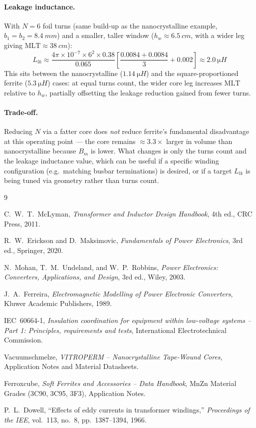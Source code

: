\documentclass[11pt,a4paper]{article}
\begin{document}
\paragraph{Leakage inductance.} With $N=6$ foil turns (same build-up as the
nanocrystalline example, $b_1=b_2=\SI{8.4}{mm}$) and a smaller, taller window
($h_w\approx\SI{6.5}{cm}$, with a wider leg giving $\mathrm{MLT}\approx\SI{38}{cm}$):
\begin{equation}
    L_{lk} \approx \frac{4\pi\times10^{-7}\times6^2\times0.38}{0.065}
    \left[\frac{0.0084+0.0084}{3}+0.002\right] \approx \SI{2.0}{\micro H}
\end{equation}
This sits between the nanocrystalline ($\SI{1.14}{\micro H}$) and the
square-proportioned ferrite ($\SI{5.3}{\micro H}$) cases: at equal turns count,
the wider core leg increases $\mathrm{MLT}$ relative to $h_w$, partially offsetting
the leakage reduction gained from fewer turns.

\paragraph{Trade-off.} Reducing $N$ via a fatter core does \emph{not} reduce
ferrite's fundamental disadvantage at this operating point — the core remains
$\approx 3.3\times$ larger in volume than nanocrystalline because $B_m$ is lower.
What changes is only the turns count and the leakage inductance value, which can
be useful if a specific winding configuration (e.g.\ matching busbar
terminations) is desired, or if a target $L_{lk}$ is being tuned via geometry
rather than turns count.

\begin{thebibliography}{9}

C.~W.~T.~McLyman, \textit{Transformer and Inductor Design Handbook}, 4th ed.,
CRC Press, 2011.

R.~W.~Erickson and D.~Maksimovic, \textit{Fundamentals of Power Electronics},
3rd ed., Springer, 2020.

N.~Mohan, T.~M.~Undeland, and W.~P.~Robbins, \textit{Power Electronics:
Converters, Applications, and Design}, 3rd ed., Wiley, 2003.

J.~A.~Ferreira, \textit{Electromagnetic Modelling of Power Electronic
Converters}, Kluwer Academic Publishers, 1989.

IEC~60664-1, \textit{Insulation coordination for equipment within low-voltage
systems -- Part 1: Principles, requirements and tests}, International
Electrotechnical Commission.

Vacuumschmelze, \textit{VITROPERM -- Nanocrystalline Tape-Wound Cores},
Application Notes and Material Datasheets.

Ferroxcube, \textit{Soft Ferrites and Accessories -- Data Handbook}, MnZn
Material Grades (3C90, 3C95, 3F3), Application Notes.

P.~L.~Dowell, ``Effects of eddy currents in transformer windings,'' \textit{
Proceedings of the IEE}, vol.~113, no.~8, pp.~1387--1394, 1966.

\end{thebibliography}
\end{document}
